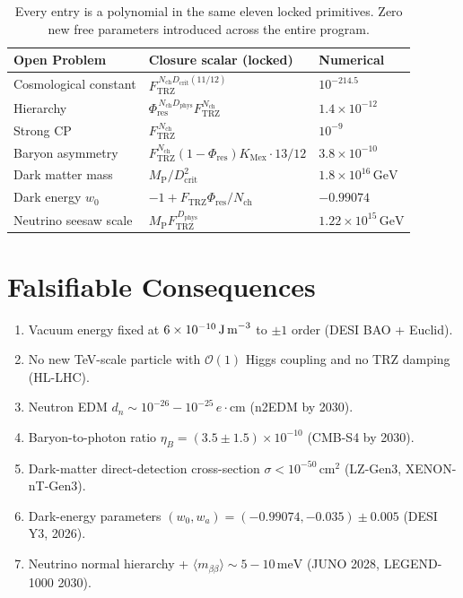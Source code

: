 \documentclass[11pt]{article}
\newcommand{\Ftrz}{F_{\mathrm{TRZ}}}
\newcommand{\Phires}{\Phi_{\mathrm{res}}}
\newcommand{\KMex}{K_{\mathrm{Mex}}}
\newcommand{\Dphys}{D_{\mathrm{phys}}}
\newcommand{\Dcrit}{D_{\mathrm{crit}}}
\newcommand{\Nch}{N_{\mathrm{ch}}}
\newcommand{\mP}{M_{\mathrm{P}}}
\begin{document}
\begin{table}[h!]
\centering
\begin{tabular}{lll}
\toprule
Open Problem & Closure scalar (locked) & Numerical \\
\midrule
Cosmological constant   & $\Ftrz^{\,\Nch\Dcrit(11/12)}$            & $10^{-214.5}$ \\
Hierarchy               & $\Phires^{\,\Nch\Dphys}\Ftrz^{\Nch}$      & $1.4\times10^{-12}$ \\
Strong CP               & $\Ftrz^{\,\Nch}$                          & $10^{-9}$ \\
Baryon asymmetry        & $\Ftrz^{\Nch}(1-\Phires)\KMex\cdot13/12$  & $3.8\times10^{-10}$ \\
Dark matter mass        & $\mP/\Dcrit^{2}$                          & $1.8\times10^{16}\,\text{GeV}$ \\
Dark energy $w_0$       & $-1+\Ftrz\Phires/\Nch$                    & $-0.99074$ \\
Neutrino seesaw scale   & $\mP\Ftrz^{\,\Dphys}$                     & $1.22\times10^{15}\,\text{GeV}$ \\
\bottomrule
\end{tabular}
\caption{Every entry is a polynomial in the same eleven locked primitives. Zero new free parameters introduced across the entire program.}
\end{table}

\section{Falsifiable Consequences}

\begin{enumerate}[label=(F\arabic*)]
\item Vacuum energy fixed at $6\times10^{-10}\,\text{J\,m}^{-3}$ to $\pm1$ order (DESI BAO + Euclid).
\item No new TeV-scale particle with $\mathcal{O}(1)$ Higgs coupling and no TRZ damping (HL-LHC).
\item Neutron EDM $d_n\sim10^{-26}-10^{-25}\,e\!\cdot\!\text{cm}$ (n2EDM by 2030).
\item Baryon-to-photon ratio $\eta_B=(3.5\pm1.5)\times10^{-10}$ (CMB-S4 by 2030).
\item Dark-matter direct-detection cross-section $\sigma<10^{-50}\,\text{cm}^2$ (LZ-Gen3, XENON-nT-Gen3).
\item Dark-energy parameters $(w_0,w_a)=(-0.99074,-0.035)\pm0.005$ (DESI Y3, 2026).
\item Neutrino normal hierarchy + $\langle m_{\beta\beta}\rangle\sim5-10\,\text{meV}$ (JUNO 2028, LEGEND-1000 2030).
\end{enumerate}
\end{document}
